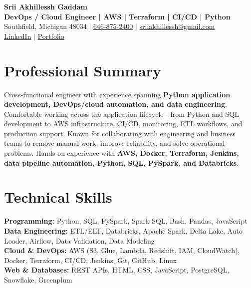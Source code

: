 \documentclass[letterpaper,10pt]{article}
\begin{document}
\fontsize{9.35pt}{10.45pt}\selectfont

\begin{center}
    {\LARGE \textbf{Srii Akhillessh Gaddam}} \\[-1pt]
    \textbf{DevOps / Cloud Engineer | AWS | Terraform | CI/CD | Python} \\[2pt]
    Southfield, Michigan 48034 $|$
    \href{tel:6468752400}{646-875-2400} $|$
    \href{mailto:sriiakhillessh@gmail.com}{sriiakhillessh@gmail.com} \\[1pt]
    \href{https://www.linkedin.com/in/srii-akhiilessh-gaddam-b48668191/}{LinkedIn} $|$
    \href{https://sriiakhillesshg.github.io/portfolio/}{Portfolio}
\end{center}
\vspace{-8pt}

\section{Professional Summary}
\small{Cross-functional engineer with experience spanning \textbf{Python application development, DevOps/cloud automation, and data engineering}. Comfortable working across the application lifecycle - from Python and SQL development to AWS infrastructure, CI/CD, monitoring, ETL workflows, and production support. Known for collaborating with engineering and business teams to remove manual work, improve reliability, and solve operational problems. Hands-on experience with \textbf{AWS, Docker, Terraform, Jenkins, data pipeline automation, Python, SQL, PySpark, and Databricks}.}

\section{Technical Skills}
\small{
\textbf{Programming:} Python, SQL, PySpark, Spark SQL, Bash, Pandas, JavaScript \\
\textbf{Data Engineering:} ETL/ELT, Databricks, Apache Spark, Delta Lake, Auto Loader, Airflow, Data Validation, Data Modeling \\
\textbf{Cloud \& DevOps:} AWS (S3, Glue, Lambda, Redshift, IAM, CloudWatch), Docker, Terraform, CI/CD, Jenkins, Git, GitHub, Linux \\
\textbf{Web \& Databases:} REST APIs, HTML, CSS, JavaScript, PostgreSQL, Snowflake, Greenplum
}
\end{document}
